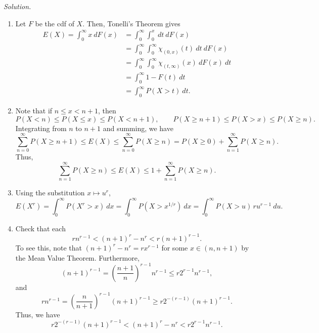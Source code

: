 \documentclass[10pt]{article}
\newcommand{\solution}{\textit{Solution.} }
\begin{document}
    \solution \begin{enumerate}
        \item Let $F$ be the cdf of $X$. Then, Tonelli's Theorem gives \begin{align*}
            E(X) = \int_0^\infty x \:dF(x) &= \int_0^\infty \int_0^x \:dt \:dF(x) \\
            &= \int_0^\infty \int_0^\infty \chi_{(0, x)}(t) \:dt \:dF(x) \\
            &= \int_0^\infty \int_0^\infty \chi_{(t, \infty)}(x) \:dF(x) \:dt \\
            &= \int_0^\infty 1 - F(t) \:dt \\
            &= \int_0^\infty P(X > t) \:dt.
        \end{align*}

        \item Note that if $n \leq x < n + 1$, then \[
            P(X < n) \leq P(X \leq x) \leq P(X < n + 1), \qquad
            P(X \geq n + 1) \leq P(X > x) \leq P(X \geq n).
        \] Integrating from $n$ to $n + 1$ and summing, we have \[
            \sum_{n = 0}^\infty P(X \geq n + 1) \leq E(X) \leq \sum_{n = 0}^\infty
            P(X \geq n) = P(X \geq 0) + \sum_{n = 1}^\infty P(X \geq n).
        \] Thus, \[
            \sum_{n = 1}^\infty P(X \geq n) \leq E(X) \leq 1 + \sum_{n = 1}^\infty
            P(X \geq n).
        \]


        \item Using the substitution $x \mapsto u^r$, \[
            E(X^r) = \int_0^\infty P(X^r > x) \:dx
            = \int_0^\infty P(X > x^{1 / r}) \:dx
            = \int_0^\infty P(X > u) \,ru^{r - 1}\:du.
        \]

        \item Check that each \[
            rn^{r - 1} < (n + 1)^r - n^r < r(n + 1)^{r - 1}.
        \] To see this, note that $(n + 1)^r - n^r = rx^{r - 1}$ for some $x \in (n,
        n + 1)$ by the Mean Value Theorem. Furthermore, \[
            (n + 1)^{r - 1} = \left(\frac{n + 1}{n}\right)^{r - 1}n^{r - 1} \leq
            r2^{r - 1} n^{r - 1},
        \] and \[
            rn^{r - 1} = \left(\frac{n}{n + 1}\right)^{r - 1} (n + 1)^{r - 1} \geq
            r2^{-(r - 1)} (n + 1)^{r - 1}.
        \] Thus, we have \[
            r2^{-(r - 1)} (n + 1)^{r - 1} < (n + 1)^r - n^r < r2^{r - 1} n^{r - 1}.
        \]


\end{enumerate}
\end{document}
